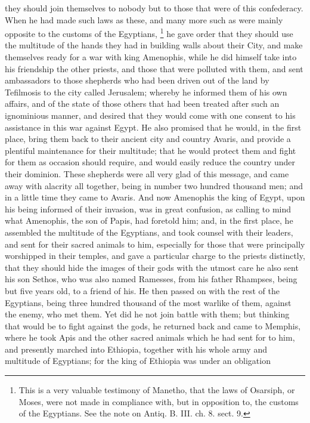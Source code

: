 they should join themselves to nobody but to those that were of this
confederacy. When he had made such laws as these, and many more such as
were mainly opposite to the customs of the Egyptians, \footnote{This is a very valuable
testimony of Manetho, that the laws of Osarsiph, or Moses, were not made
in compliance with, but in opposition to, the customs of the Egyptians.
See the note on Antiq. B. III. ch. 8. sect. 9.}
he gave order that they should use the multitude of the hands they had in
building walls about their City, and make themselves ready for a war with
king Amenophis, while he did himself take into his friendship the other
priests, and those that were polluted with them, and sent ambassadors to
those shepherds who had been driven out of the land by Tefilmosis to the
city called Jerusalem; whereby he informed them of his own affairs, and of
the state of those others that had been treated after such an ignominious
manner, and desired that they would come with one consent to his
assistance in this war against Egypt. He also promised that he would, in
the first place, bring them back to their ancient city and country Avaris,
and provide a plentiful maintenance for their multitude; that he would
protect them and fight for them as occasion should require, and would
easily reduce the country under their dominion. These shepherds were all
very glad of this message, and came away with alacrity all together, being
in number two hundred thousand men; and in a little time they came to
Avaris. And now Amenophis the king of Egypt, upon his being informed of
their invasion, was in great confusion, as calling to mind what Amenophis,
the son of Papis, had foretold him; and, in the first place, he assembled
the multitude of the Egyptians, and took counsel with their leaders, and
sent for their sacred animals to him, especially for those that were
principally worshipped in their temples, and gave a particular charge to
the priests distinctly, that they should hide the images of their gods
with the utmost care he also sent his son Sethos, who was also named
Ramesses, from his father Rhampses, being but five years old, to a friend
of his. He then passed on with the rest of the Egyptians, being three
hundred thousand of the most warlike of them, against the enemy, who met
them. Yet did he not join battle with them; but thinking that would be to
fight against the gods, he returned back and came to Memphis, where he
took Apis and the other sacred animals which he had sent for to him, and
presently marched into Ethiopia, together with his whole army and
multitude of Egyptians; for the king of Ethiopia was under an obligation
